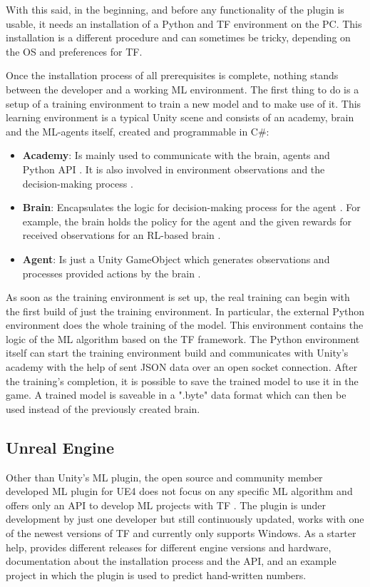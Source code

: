 \documentclass[MGS,Master,english]{twbook}%
\begin{document}
With this said, in the beginning, and before any functionality of the plugin is usable, it needs an installation of a Python and \ac{TF} environment on the PC. This installation is a different procedure and can sometimes be tricky, depending on the \ac{OS} and preferences for \ac{TF}.

Once the installation process of all prerequisites is complete, nothing stands between the developer and a working ML environment. The first thing to do is a setup of a training environment to train a new model and to make use of it. This learning environment is a typical Unity scene and consists of an academy, brain and the ML-agents itself, created and programmable in C\#:
\begin{itemize}
	\item \textbf{Academy}: Is mainly used to communicate with the brain, agents and Python API \cite{unity::mlGithub}. It is also involved in environment observations and the decision-making process \cite{unity::mlGithub}. 
	\item \textbf{Brain}: Encapsulates the logic for decision-making process for the agent \cite{unity::mlGithub}. For example, the brain holds the policy for the agent and the given rewards for received observations for an RL-based brain \cite{unity::mlGithub}.
	\item \textbf{Agent}: Is just a Unity GameObject which generates observations and processes provided actions by the brain \cite{unity::mlGithub}.
\end{itemize}  
As soon as the training environment is set up, the real training can begin with the first build of just the training environment. In particular, the external Python environment does the whole training of the model. This environment contains the logic of the ML algorithm based on the \ac{TF} framework. The Python environment itself can start the training environment build and communicates with Unity’s academy with the help of sent \ac{JSON} data over an open socket connection. After the training's completion, it is possible to save the trained model to use it in the game. A trained model is saveable in a ".byte" data format which can then be used instead of the previously created brain.

\subsection{Unreal Engine}
Other than Unity’s ML plugin, the open source and community member developed ML plugin for \ac{UE4} does not focus on any specific ML algorithm and offers only an API to develop ML projects with \ac{TF} \cite{ue4::tensorFlowPlugin}. The plugin is under development by just one developer but still continuously updated, works with one of the newest versions of \ac{TF} and currently only supports Windows. As a starter help, \citep{ue4::tensorFlowPlugin} provides different releases for different engine versions and hardware, documentation about the installation process and the API, and an example project in which the plugin is used to predict hand-written numbers.
\end{document}
